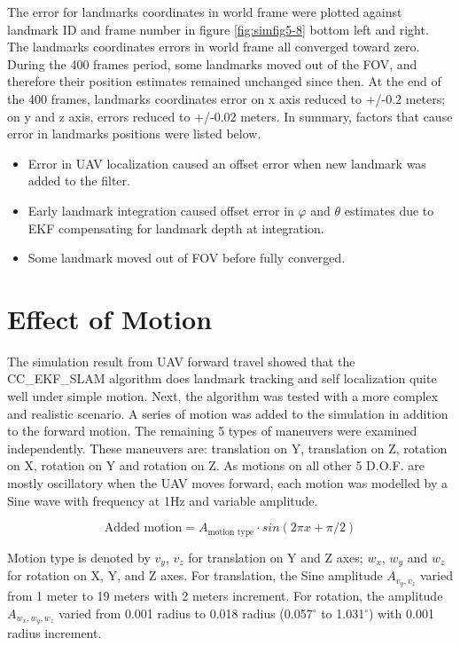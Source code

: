 The error for landmarks coordinates in world frame were plotted
against landmark ID and frame number in figure \ref{fig:simfig5-8}
bottom left and right. The landmarks coordinates errors in world frame
all converged toward zero. During the 400 frames period, some
landmarks moved out of the FOV, and therefore their position estimates
remained unchanged since then. At the end of the 400 frames, landmarks
coordinates error on x axis reduced to +/-0.2 meters; on y and z axis,
errors reduced to +/-0.02 meters. In summary, factors that cause
error in landmarks positions were listed below. 

\begin{itemize}
  \item Error in UAV localization caused an offset error when new
  landmark was added to the filter.
  \item Early landmark integration caused offset error in $\varphi$
  and $\theta$ estimates due to EKF compensating for landmark depth at
  integration.
  \item Some landmark moved out of FOV before fully converged.
\end{itemize}
\FloatBarrier

\section{Effect of Motion}
The simulation result from UAV forward travel showed that the
CC\_EKF\_SLAM algorithm does landmark tracking and self localization
quite well under simple motion. Next, the algorithm was tested with a
more complex and realistic scenario. A series of motion was added to
the simulation in addition to the forward motion. The remaining 5
types of maneuvers were examined independently. These maneuvers are:
translation on Y, translation on Z, rotation on X, rotation on Y and
rotation on Z. As motions on all other 5 D.O.F. are mostly oscillatory
when the UAV moves forward, each motion was modelled by a Sine wave
with frequency at 1Hz and variable amplitude. 

$$\text{Added motion} = A_{\text{motion type}}\cdot sin(2\pi x+\pi/2)$$

Motion type is denoted by $v_y$, $v_z$ for translation on Y and Z
axes; $w_x$, $w_y$ and $w_z$ for rotation on X, Y, and Z axes. For
translation, the Sine amplitude $A_{v_y,v_z}$ varied from 1 meter to
19 meters with 2 meters increment. For rotation, the amplitude
$A_{w_x,w_y,w_z}$ varied from 0.001 radius to 0.018 radius
(0.057$^\circ$ to 1.031$^\circ$) with 0.001 radius increment.


